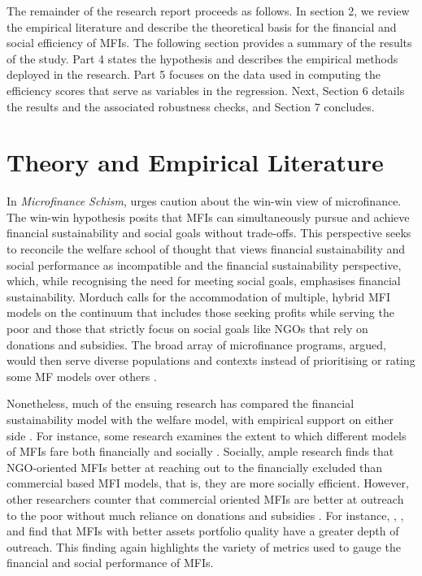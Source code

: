 \documentclass[a4paper, nobind]{templates/ociamthesis}
\begin{document}
The remainder of the research report proceeds as follows. In section 2, we review the empirical literature and describe the theoretical basis for the financial and social efficiency of MFIs. The following section provides a summary of the results of the study. Part 4 states the hypothesis and describes the empirical methods deployed in the research. Part 5 focuses on the data used in computing the efficiency scores that serve as variables in the regression. Next, Section 6 details the results and the associated robustness checks, and Section 7 concludes.

\hypertarget{theory-and-empirical-literature-1}{%
\section{Theory and Empirical Literature}\label{theory-and-empirical-literature-1}}

In \emph{Microfinance Schism}, \textcite{morduch2000microfinance} urges caution about the win-win view of microfinance. The win-win hypothesis posits that MFIs can simultaneously pursue and achieve financial sustainability and social goals without trade-offs. This perspective seeks to reconcile the welfare school of thought that views financial sustainability and social performance as incompatible and the financial sustainability perspective, which, while recognising the need for meeting social goals, emphasises financial sustainability. Morduch calls for the accommodation of multiple, hybrid MFI models on the continuum that includes those seeking profits while serving the poor and those that strictly focus on social goals like NGOs that rely on donations and subsidies. The broad array of microfinance programs, \textcite{morduch2000microfinance} argued, would then serve diverse populations and contexts instead of prioritising or rating some MF models over others \autocite{marconatto2016going}.

Nonetheless, much of the ensuing research has compared the financial sustainability model with the welfare model, with empirical support on either side \autocite{kodongo2013individual}. For instance, some research examines the extent to which different models of MFIs fare both financially and socially \autocite{abeysekera2014sustainability,bedecarrats2012combining}. Socially, ample research finds that NGO-oriented MFIs better at reaching out to the financially excluded than commercial based MFI models, that is, they are more socially efficient. However, other researchers counter that commercial oriented MFIs are better at outreach to the poor without much reliance on donations and subsidies \autocite{abeysekera2014sustainability,kar2013mission,roberts2013profit}. For instance, \textcite{dorfleitner2017microfinance}, \textcite{dorfleitner2017access}, and \textcite{bos2015practice} find that MFIs with better assets portfolio quality have a greater depth of outreach. This finding again highlights the variety of metrics used to gauge the financial and social performance of MFIs.
\end{document}
